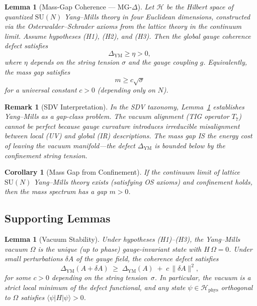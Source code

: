 \documentclass[11pt]{article}
\newtheorem{lemma}[theorem]{Lemma}
\newtheorem{corollary}[theorem]{Corollary}
\newtheorem{remark}[theorem]{Remark}
\begin{document}
\begin{lemma}[Mass-Gap Coherence --- MG-$\Delta$]
\label{lem:MG-delta}
Let $\mathcal{H}$ be the Hilbert space of quantized $\mathrm{SU}(N)$
Yang--Mills theory in four Euclidean dimensions, constructed via the
Osterwalder--Schrader axioms from the lattice theory in the
continuum limit.  Assume hypotheses (H1), (H2), and (H3).  Then the
global gauge coherence defect satisfies
\begin{equation}\label{eq:mg-delta}
  \Delta_{\mathrm{YM}} \geq \eta > 0,
\end{equation}
where $\eta$ depends on the string tension $\sigma$ and the gauge
coupling $g$.  Equivalently, the mass gap satisfies
\begin{equation}\label{eq:mass-bound}
  m \geq c\sqrt{\sigma}
\end{equation}
for a universal constant $c > 0$ (depending only on $N$).
\end{lemma}

\begin{remark}[SDV Interpretation]
\label{rem:sdv-interp}
In the SDV taxonomy, Lemma~\ref{lem:MG-delta} establishes Yang--Mills
as a \emph{gap-class} problem.  The vacuum alignment (TIG operator
$T_7$) cannot be perfect because gauge curvature introduces irreducible
misalignment between local (UV) and global (IR) descriptions.  The mass
gap IS the energy cost of leaving the vacuum manifold---the defect
$\Delta_{\mathrm{YM}}$ is bounded below by the confinement string
tension.
\end{remark}

\begin{corollary}[Mass Gap from Confinement]
\label{cor:massgap}
If the continuum limit of lattice $\mathrm{SU}(N)$ Yang--Mills theory
exists (satisfying OS axioms) and confinement holds, then the mass
spectrum has a gap $m > 0$.
\end{corollary}

\subsection{Supporting Lemmas}

\begin{lemma}[Vacuum Stability]
\label{lem:vacuum-stability}
Under hypotheses \textup{(H1)--(H3)}, the Yang--Mills vacuum $\Omega$
is the unique (up to phase) gauge-invariant state with
$H\,\Omega = 0$.  Under small perturbations $\delta\!A$ of the gauge
field, the coherence defect satisfies
\begin{equation}\label{eq:vacuum-stability}
  \Delta_{\mathrm{YM}}(A + \delta\!A)
  \;\geq\;
  \Delta_{\mathrm{YM}}(A) \;+\; c\,\|\delta\!A\|^2,
\end{equation}
for some $c > 0$ depending on the string tension~$\sigma$.  In
particular, the vacuum is a \emph{strict local minimum} of the defect
functional, and any state $\psi \in \mathcal{H}_{\mathrm{phys}}$
orthogonal to $\Omega$ satisfies
$\langle\psi|H|\psi\rangle > 0$.
\end{lemma}
\end{document}
